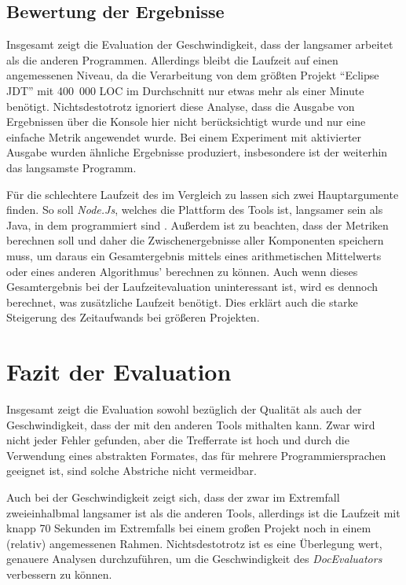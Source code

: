 \subsection{Bewertung der Ergebnisse}
Insgesamt zeigt die Evaluation der Geschwindigkeit, dass der \doceval langsamer arbeitet als die anderen Programmen. Allerdings  bleibt die Laufzeit auf einen angemessenen Niveau, da die Verarbeitung von dem größten Projekt \enquote{Eclipse \ac{JDT}} mit 400~000 \ac{LOC} im Durchschnitt nur etwas mehr als einer Minute benötigt. Nichtsdestotrotz ignoriert diese Analyse, dass die Ausgabe von Ergebnissen über die Konsole hier nicht berücksichtigt wurde und nur eine einfache Metrik angewendet wurde. Bei einem Experiment mit aktivierter Ausgabe wurden ähnliche Ergebnisse produziert, insbesondere ist der \doceval weiterhin das langsamste Programm. 

Für die schlechtere Laufzeit des \doceval im Vergleich zu \checkpmd lassen sich zwei Hauptargumente finden. So soll \textit{Node.Js}, welches die Plattform des Tools ist, langsamer sein als Java, in dem \checkpmd programmiert sind \cite{node_java_speed}.  Außerdem ist zu beachten, dass der \doceval Metriken berechnen soll und daher die Zwischenergebnisse aller Komponenten speichern muss, um daraus ein Gesamtergebnis mittels eines arithmetischen Mittelwerts oder eines anderen Algorithmus' berechnen zu können. Auch wenn dieses Gesamtergebnis bei der Laufzeitevaluation uninteressant ist, wird es dennoch berechnet, was zusätzliche Laufzeit benötigt. Dies erklärt auch die starke Steigerung des Zeitaufwands bei größeren Projekten.

\section{Fazit der Evaluation}\label{chapter:eval_conclusion}

Insgesamt zeigt die Evaluation sowohl bezüglich der Qualität als auch der Geschwindigkeit, dass der \doceval mit den anderen Tools mithalten kann. Zwar wird nicht jeder Fehler gefunden, aber die Trefferrate ist hoch und durch die Verwendung eines abstrakten Formates, das für mehrere Programmiersprachen geeignet ist, sind solche Abstriche nicht vermeidbar. 

Auch bei der Geschwindigkeit zeigt sich, dass der \doceval zwar im Extremfall zweieinhalbmal langsamer ist als die anderen Tools, allerdings ist die Laufzeit mit knapp 70 Sekunden im Extremfalls bei einem großen Projekt noch in einem (relativ) angemessenen Rahmen. Nichtsdestotrotz ist es eine Überlegung wert, genauere Analysen durchzuführen, um die Geschwindigkeit des \textit{DocEvaluators} verbessern zu können. 
